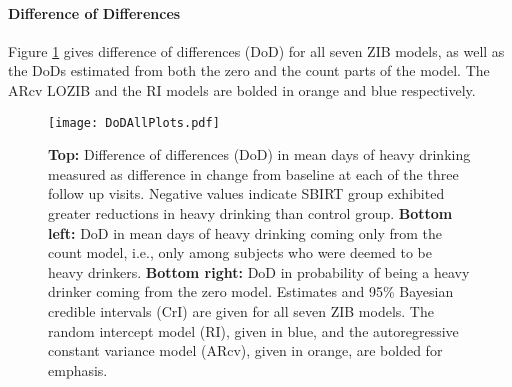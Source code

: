 \documentclass[12pt]{article}
\begin{document}

\paragraph{Difference of Differences}
Figure \ref{fig:DoDplots} gives difference of differences (DoD) for all seven ZIB models, as well as the DoDs estimated from both the zero and the count parts of the model. The ARcv LOZIB and the RI models are bolded in orange and blue respectively.

\begin{figure}[t]
	\centering
	\texttt{[image: DoDAllPlots.pdf]}
	\caption{\textbf{Top:} Difference of differences (DoD) in mean days of heavy drinking measured as difference in change from baseline at each of the three follow up visits. Negative values indicate SBIRT group exhibited greater reductions in heavy drinking than control group. \textbf{Bottom left:} DoD in mean days of heavy drinking coming only from the count model, i.e., only among subjects who were deemed to be heavy drinkers. \textbf{Bottom right:} DoD in probability of being a heavy drinker coming from the zero model. Estimates and 95\% Bayesian credible intervals (CrI) are given for all seven ZIB models. The random intercept model (RI), given in blue, and the autoregressive constant variance model (ARcv), given in orange, are bolded for emphasis.}
	\label{fig:DoDplots}
\end{figure}
\end{document}
